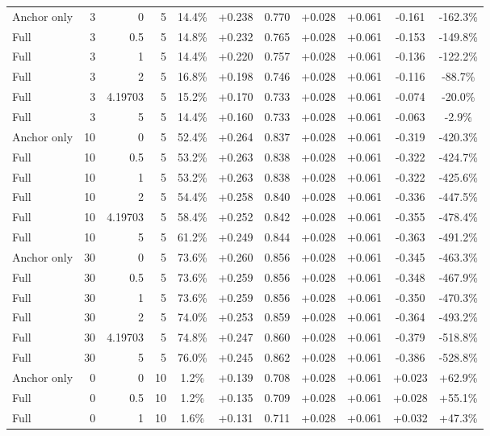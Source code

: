 \begin{table}[htbp]
\begin{tabular}{lrrrccccccc}
Anchor only & 3 & 0 & 5 & 14.4\% & +0.238 & 0.770 & +0.028 & +0.061 & -0.161 & -162.3\% \\
Full & 3 & 0.5 & 5 & 14.8\% & +0.232 & 0.765 & +0.028 & +0.061 & -0.153 & -149.8\% \\
Full & 3 & 1 & 5 & 14.4\% & +0.220 & 0.757 & +0.028 & +0.061 & -0.136 & -122.2\% \\
Full & 3 & 2 & 5 & 16.8\% & +0.198 & 0.746 & +0.028 & +0.061 & -0.116 & -88.7\% \\
Full & 3 & 4.19703 & 5 & 15.2\% & +0.170 & 0.733 & +0.028 & +0.061 & -0.074 & -20.0\% \\
Full & 3 & 5 & 5 & 14.4\% & +0.160 & 0.733 & +0.028 & +0.061 & -0.063 & -2.9\% \\
Anchor only & 10 & 0 & 5 & 52.4\% & +0.264 & 0.837 & +0.028 & +0.061 & -0.319 & -420.3\% \\
Full & 10 & 0.5 & 5 & 53.2\% & +0.263 & 0.838 & +0.028 & +0.061 & -0.322 & -424.7\% \\
Full & 10 & 1 & 5 & 53.2\% & +0.263 & 0.838 & +0.028 & +0.061 & -0.322 & -425.6\% \\
Full & 10 & 2 & 5 & 54.4\% & +0.258 & 0.840 & +0.028 & +0.061 & -0.336 & -447.5\% \\
Full & 10 & 4.19703 & 5 & 58.4\% & +0.252 & 0.842 & +0.028 & +0.061 & -0.355 & -478.4\% \\
Full & 10 & 5 & 5 & 61.2\% & +0.249 & 0.844 & +0.028 & +0.061 & -0.363 & -491.2\% \\
Anchor only & 30 & 0 & 5 & 73.6\% & +0.260 & 0.856 & +0.028 & +0.061 & -0.345 & -463.3\% \\
Full & 30 & 0.5 & 5 & 73.6\% & +0.259 & 0.856 & +0.028 & +0.061 & -0.348 & -467.9\% \\
Full & 30 & 1 & 5 & 73.6\% & +0.259 & 0.856 & +0.028 & +0.061 & -0.350 & -470.3\% \\
Full & 30 & 2 & 5 & 74.0\% & +0.253 & 0.859 & +0.028 & +0.061 & -0.364 & -493.2\% \\
Full & 30 & 4.19703 & 5 & 74.8\% & +0.247 & 0.860 & +0.028 & +0.061 & -0.379 & -518.8\% \\
Full & 30 & 5 & 5 & 76.0\% & +0.245 & 0.862 & +0.028 & +0.061 & -0.386 & -528.8\% \\
Anchor only & 0 & 0 & 10 & 1.2\% & +0.139 & 0.708 & +0.028 & +0.061 & +0.023 & +62.9\% \\
Full & 0 & 0.5 & 10 & 1.2\% & +0.135 & 0.709 & +0.028 & +0.061 & +0.028 & +55.1\% \\
Full & 0 & 1 & 10 & 1.6\% & +0.131 & 0.711 & +0.028 & +0.061 & +0.032 & +47.3\% \\

\end{tabular}
\end{table}
